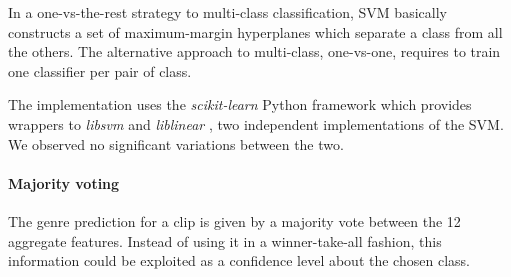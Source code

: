 In a one-vs-the-rest strategy to multi-class classification, \gls{SVM} basically constructs a set of maximum-margin hyperplanes which separate a class from all the others. The alternative approach to multi-class, one-vs-one, requires to train one classifier per pair of class.

The implementation uses the \textit{scikit-learn} Python framework \cite{sklearn} which provides wrappers to \textit{libsvm} \cite{libsvm} and \textit{liblinear} \cite{liblinear}, two independent implementations of the \gls{SVM}. We observed no significant variations between the two.

\paragraph{Majority voting}
The genre prediction for a clip is given by a majority vote between the 12 aggregate features. Instead of using it in a winner-take-all fashion, this information could be exploited as a confidence level about the chosen class.









